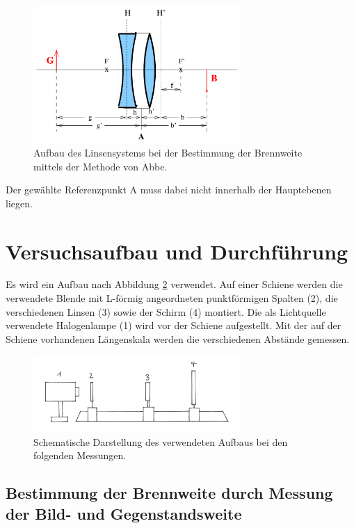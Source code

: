 \begin{figure}
  \centering
  \includegraphics[width = 0.7\textwidth]{Linsensystem.png}
  \caption{Aufbau des Linsensystems bei der Bestimmung der Brennweite mittels der
  Methode von Abbe.\cite{anleitung01}}
  \label{fig:Linsensystem}
\end{figure}

Der gewählte Referenzpunkt A muss dabei nicht innerhalb der Hauptebenen liegen.

\section{Versuchsaufbau und Durchführung}

Es wird ein Aufbau nach Abbildung \ref{fig:Aufbau} verwendet. Auf einer
Schiene werden die verwendete Blende mit L-förmig angeordneten punktförmigen
Spalten (2), die verschiedenen Linsen (3) sowie der Schirm (4) montiert. Die als
Lichtquelle verwendete Halogenlampe (1) wird vor der Schiene aufgestellt.
Mit der auf der Schiene vorhandenen Längenskala werden die verschiedenen
Abstände gemessen.

\begin{figure}
  \centering
  \includegraphics[width = 0.7\textwidth]{Aufbau.JPG}
  \caption{Schematische Darstellung des verwendeten Aufbaus bei den folgenden Messungen. \cite{anleitung01}}
  \label{fig:Aufbau}
\end{figure}

\subsection{Bestimmung der Brennweite durch Messung der Bild- und Gegenstandsweite}

